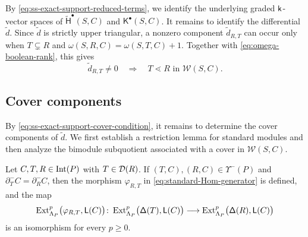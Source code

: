 By \eqref{eq:ss-exact-support-reduced-terms}, we identify the
underlying graded $\mathsf{k}$-vector spaces of
$\widetilde{\mathsf H}^\bullet(S,C)$ and
$\mathsf K^\bullet(S,C)$.
It remains to identify the differential
$\widetilde d$.  Since $\widetilde d$ is strictly upper triangular,
a nonzero component $\widetilde d_{R,T}$ can occur only when
$T\subsetneq R$ and
$\omega(S,R,C)=\omega(S,T,C)+1$.  Together with
\eqref{eq:omega-boolean-rank}, this gives
\begin{equation}
\label{eq:ss-exact-support-cover-condition}
\widetilde d_{R,T}\neq0
\quad\Longrightarrow\quad
T\lessdot R
\text{ in }\mathcal W(S,C).
\end{equation}


\subsection{Cover components}
\label{app:ss-cover-components}

By \eqref{eq:ss-exact-support-cover-condition}, it remains to determine the cover components of $\widetilde d$.
We first establish a restriction lemma for standard modules and then
analyze the bimodule subquotient associated with a cover in
$\mathcal W(S,C)$.


\begin{lemma}
\label{lem:ss-standard-restriction-isomorphism}
Let $C,T,R\in\operatorname{Int}(P)$ with $T\in\mathcal D(R)$.
If $(T,C),(R,C)\in \Upsilon^-(P)$ and
$\partial_T^-C=\partial_R^-C$, then the morphism $\varphi_{R,T}$ in \eqref{eq:standard-Hom-generator} is defined, and the map
\begin{equation}
\label{eq:ss-standard-restriction-map}
\operatorname{Ext}_{\Lambda_P}^p\bigl(\varphi_{R,T},\mathsf L(C)\bigr)
\colon
\operatorname{Ext}_{\Lambda_P}^p\bigl(\mathsf\Delta(T),\mathsf L(C)\bigr)
\longrightarrow
\operatorname{Ext}_{\Lambda_P}^p\bigl(\mathsf\Delta(R),\mathsf L(C)\bigr)
\end{equation}
is an isomorphism for every $p\geq0$.
\end{lemma}

